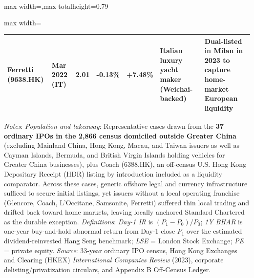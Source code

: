 \documentclass[11pt,letterpaper]{article}
\begin{document}
\begin{table}[!htbp]
\begin{adjustbox}{max width=\textwidth,max totalheight=0.79\textheight}
\begin{minipage}{\textwidth}
\begin{adjustbox}{max width=\textwidth}
\begin{tabular}{>{\raggedright\arraybackslash}p{2.46cm}>{\centering\arraybackslash}p{1.90cm}ccc>{\raggedright\arraybackslash}p{3.88cm}>{\raggedright\arraybackslash}p{3.88cm}}
\textbf{Ferretti (9638.HK)} & Mar 2022 (IT) & 2.01 & -0.13\% & +7.48\% & Italian luxury yacht maker (Weichai-backed) & \textbf{Dual-listed in Milan in 2023} to capture home-market European liquidity \\
\bottomrule
\end{tabular}
\end{adjustbox}
\end{minipage}
\end{adjustbox}
\par\vspace{3pt}\noindent\parbox{\textwidth}{\scriptsize\raggedright \textit{Notes}: \textit{Population and takeaway}: Representative cases drawn from the \textbf{37 ordinary IPOs in the 2,866 census domiciled outside Greater China} (excluding Mainland China, Hong Kong, Macau, and Taiwan issuers as well as Cayman Islands, Bermuda, and British Virgin Islands holding vehicles for Greater China businesses), plus Coach (6388.HK), an off-census U.S. Hong Kong Depositary Receipt (HDR) listing by introduction included as a liquidity comparator. Across these cases, generic offshore legal and currency infrastructure sufficed to secure initial listings, yet issuers without a local operating franchise (Glencore, Coach, L'Occitane, Samsonite, Ferretti) suffered thin local trading and drifted back toward home markets, leaving locally anchored Standard Chartered as the durable exception. \textit{Definitions}: \textit{Day-1 IR} is $(P_1 - P_0)/P_0$; \textit{1Y BHAR} is one-year buy-and-hold abnormal return from Day-1 close $P_1$ over the estimated dividend-reinvested Hang Seng benchmark; \textit{LSE} = London Stock Exchange; \textit{PE} = private equity. \textit{Source}: 33-year ordinary IPO census, Hong Kong Exchanges and Clearing (HKEX) \textit{International Companies Review} (2023), corporate delisting/privatization circulars, and Appendix B Off-Census Ledger.}
\end{table}
\end{document}
